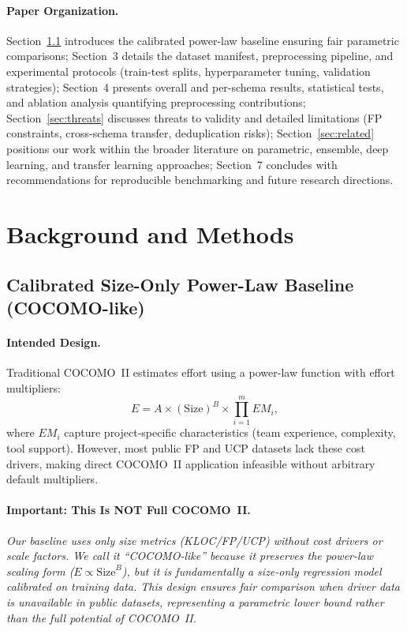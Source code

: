 \documentclass{ieeeaccess}
\begin{document}
\paragraph{Paper Organization.}
Section~\ref{sec:baseline} introduces the calibrated power-law baseline ensuring fair parametric comparisons;
Section~3 details the dataset manifest, preprocessing pipeline, and experimental protocols (train-test splits, hyperparameter tuning, validation strategies);
Section~4 presents overall and per-schema results, statistical tests, and ablation analysis quantifying preprocessing contributions;
Section~\ref{sec:threats} discusses threats to validity and detailed limitations (FP constraints, cross-schema transfer, deduplication risks);
Section~\ref{sec:related} positions our work within the broader literature on parametric, ensemble, deep learning, and transfer learning approaches;
Section~7 concludes with recommendations for reproducible benchmarking and future research directions.

\section{Background and Methods}
\subsection{Calibrated Size-Only Power-Law Baseline (COCOMO-like)}
\label{sec:baseline}

\paragraph{Intended Design.}
Traditional COCOMO~II estimates effort using a power-law function with effort multipliers:
\begin{equation}
E = A \times (\text{Size})^{B} \times \prod_{i=1}^{m} EM_i,
\label{eq:cocomo-full}
\end{equation}
where $EM_i$ capture project-specific characteristics (team experience, complexity, tool support). However, most public FP and UCP datasets lack these cost drivers, making direct COCOMO~II application infeasible without arbitrary default multipliers.

\paragraph{\textbf{Important:} This Is NOT Full COCOMO~II.}
\textit{Our baseline uses only size metrics (KLOC/FP/UCP) without cost drivers or scale factors. We call it ``COCOMO-like'' because it preserves the power-law scaling form ($E \propto \text{Size}^B$), but it is fundamentally a size-only regression model calibrated on training data. This design ensures fair comparison when driver data is unavailable in public datasets, representing a parametric lower bound rather than the full potential of COCOMO~II.}
\end{document}
